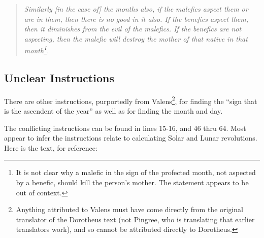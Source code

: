 \begin{quote}
\textsl{Similarly [in the case of] the months also, if the malefics aspect them or are in them, then there is no good in it also. If the benefics aspect them, then it diminishes from the evil of the malefics. If the benefics are not aspecting, then the malefic will destroy the mother of that native in that month\footnote{It is not clear why a malefic in the sign of the profected month, not aspected by a benefic, should kill the person's mother. The statement appears to be out of context.}.}
\end{quote}

\subsection{Unclear Instructions}
There are other instructions, purportedly from Valens\footnote{Anything attributed to Valens must have come directly from the original translator of the Dorotheus text (not Pingree, who is translating that earlier translators work), and so cannot be attributed directly to Dorotheus.}, for finding  the ``sign that is the ascendent of the year'' as well as for finding the month and day.

The conflicting instructions can be found in lines 15-16, and 46 thru 64. Most appear to infer the instructions relate to calculating Solar and Lunar revolutions. Here is the text, for reference:

